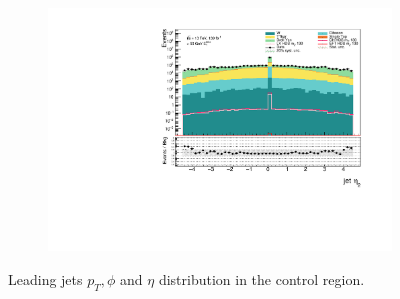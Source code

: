 \documentclass[12pt, a4paper]{book}
\begin{document}
\begin{figure}[!ht]
\begin{subfigure}[b]{0.49\textwidth}
        \includegraphics[width=\textwidth]{eta2_jet.pdf}
    \end{subfigure}
    \caption{Leading jets $p_T, \phi$ and $\eta$ distribution in the control region.}
\end{figure}
\end{document}
